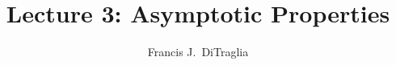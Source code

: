 \documentclass[12pt]{article}
\theoremstyle{definition}
\begin{document}
\title{Lecture 3: Asymptotic Properties}

\author{Francis J.\ DiTraglia}

\maketitle 





\end{document}
